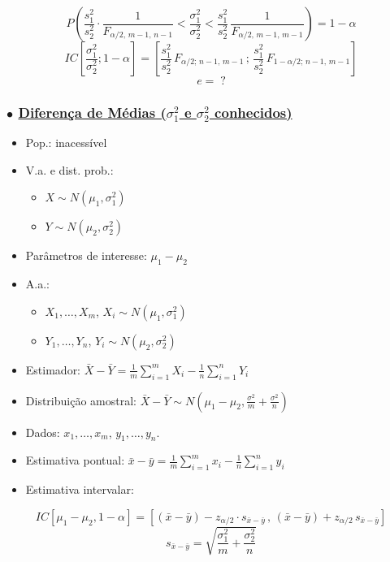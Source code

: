 \documentclass[11pt,a4paper]{article}
\begin{document}
\[ P\left(\frac{s_1^2}{s_2^2}\cdot\frac{1}{F_{\alpha/2,\,m-1,\,n-1}} < \frac{\sigma_1^2}{\sigma_2^2} < \frac{s_1^2}{s_2^2}\,\frac{1}{F_{\alpha/2,\,m-1,\,m-1}}\right) = 1-\alpha \]
\[ IC\left[\frac{\sigma_1^2}{\sigma_2^2};1-\alpha\right] = \left[\frac{s_1^2}{s_2^2}\,F_{\alpha/2;\,n-1,\,m-1}\,;\,\frac{s_1^2}{s_2^2}\,F_{1-\alpha/2;\,n-1,\,m-1}\right] \]
\[ e = \;? \]

\subsubsection*{$\bullet$ \underline{Diferença de Médias ($\sigma_1^2$ e $\sigma_2^2$ conhecidos)}}
\begin{itemize}
  \item Pop.: inacessível
  \item V.a. e dist. prob.:
  \begin{itemize}[label=$\cdot$]
    \item $X \sim N(\mu_1,\sigma_1^2)$
    \item $Y \sim N(\mu_2,\sigma_2^2)$
  \end{itemize}
  \item Parâmetros de interesse: $\mu_1-\mu_2$
  \item A.a.:
  \begin{itemize}[label=$\cdot$]
    \item $X_1,\ldots,X_m$, $X_i \sim N(\mu_1,\sigma_1^2)$
    \item $Y_1,\ldots,Y_n$, $Y_i \sim N(\mu_2,\sigma_2^2)$
  \end{itemize}
  \item Estimador: $\displaystyle \bar{X}-\bar{Y} = \frac{1}{m}\sum_{i=1}^{m}X_i - \frac{1}{n}\sum_{i=1}^{n}Y_i$
  \item Distribuição amostral: $\displaystyle \bar{X}-\bar{Y} \sim N\!\left(\mu_1-\mu_2,\frac{\sigma^2}{m}+\frac{\sigma^2}{n}\right)$
  \item Dados: $x_1,\ldots,x_m$, $y_1,\ldots,y_n$.
  \item Estimativa pontual: $\displaystyle \bar{x}-\bar{y} = \frac{1}{m}\sum_{i=1}^{m}x_i - \frac{1}{n}\sum_{i=1}^{n}y_i$
  \item Estimativa intervalar:
\end{itemize}
\[ IC[\mu_1-\mu_2,1-\alpha] = \left[(\bar{x}-\bar{y}) - z_{\alpha/2}\cdot s_{\bar{x}-\bar{y}}\,,\,(\bar{x}-\bar{y}) + z_{\alpha/2}\,s_{\bar{x}-\bar{y}}\right] \]
\[ s_{\bar{x}-\bar{y}} = \sqrt{\frac{\sigma_1^2}{m}+\frac{\sigma_2^2}{n}} \]
\end{document}
